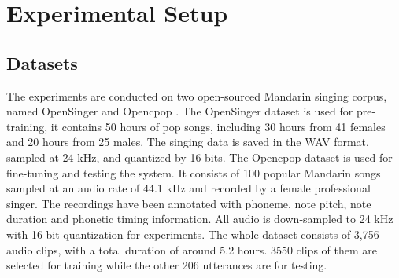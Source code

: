 \section{Experimental Setup}
\label{sec:expt-setup}

\subsection{Datasets}
%      
The experiments are conducted on two open-sourced Mandarin singing corpus, named OpenSinger \cite{huang2021multi} and Opencpop \cite{wang2022opencpop}. The OpenSinger dataset is used for pre-training, it contains 50 hours of pop songs, including 30 hours from 41 females and 20 hours from 25 males. The singing data is saved in the WAV format, sampled at 24 kHz, and quantized by 16 bits.
The Opencpop dataset is used for fine-tuning and testing the system. 
It consists of 100 popular Mandarin songs sampled at an audio rate of 44.1 kHz and recorded by a female professional singer. The recordings have been annotated with phoneme, note pitch, note duration and phonetic timing information. All audio is down-sampled to 24 kHz with 16-bit quantization for experiments. The whole dataset consists of 3,756 audio clips, with a total duration of around 5.2 hours. 3550 clips of them are selected for training while the other 206 utterances are for testing.

